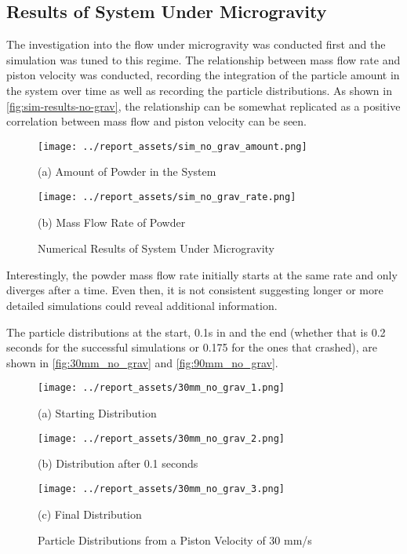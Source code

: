 \subsection{Results of System Under Microgravity}
The investigation into the flow under microgravity was conducted first and the simulation was tuned to this regime. The relationship between mass flow rate and piston velocity was conducted, recording the integration of the particle amount in the system over time as well as recording the particle distributions. As shown in \autoref{fig:sim-results-no-grav}, the relationship can be somewhat replicated as a positive correlation between mass flow and piston velocity can be seen.
\begin{figure}[htbp]
    \centering

    \begin{minipage}{0.45\textwidth}
        \centering
        \texttt{[image: ../report\_assets/sim\_no\_grav\_amount.png]}
        \caption*{(a) Amount of Powder in the System}
    \end{minipage}    
    \hfill
    \begin{minipage}{0.45\textwidth}
        \centering
        \texttt{[image: ../report\_assets/sim\_no\_grav\_rate.png]}
        \caption*{(b) Mass Flow Rate of Powder}
    \end{minipage}    
    \caption{Numerical Results of System Under Microgravity}\label{fig:sim-results-no-grav}

\end{figure} 
Interestingly, the powder mass flow rate initially starts at the same rate and only diverges after a time. Even then, it is not consistent suggesting longer or more detailed simulations could reveal additional information.

The particle distributions at the start, 0.1s in and the end (whether that is 0.2 seconds for the successful simulations or 0.175 for the ones that crashed), are shown in \autoref{fig:30mm_no_grav} and \autoref{fig:90mm_no_grav}.
\begin{figure}[htbp]
    \centering

    \begin{minipage}{0.32\textwidth}
        \centering
        \texttt{[image: ../report\_assets/30mm\_no\_grav\_1.png]}
        \caption*{(a) Starting Distribution}
    \end{minipage}
    \hfill
    \begin{minipage}{0.32\textwidth}
        \centering
        \texttt{[image: ../report\_assets/30mm\_no\_grav\_2.png]}
        \caption*{(b) Distribution after 0.1 seconds}
    \end{minipage}
    \hfill
    \begin{minipage}{0.32\textwidth}
        \centering
        \texttt{[image: ../report\_assets/30mm\_no\_grav\_3.png]}
        \caption*{(c) Final Distribution}
    \end{minipage}
    \caption{Particle Distributions from a Piston Velocity of 30 mm/s}

\end{figure}\label{fig:30mm_no_grav}

